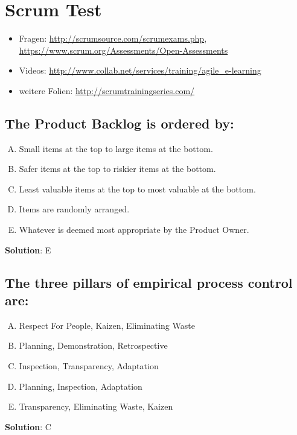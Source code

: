 \pagebreak

\section{Scrum Test}

\begin{itemize}
  \item Fragen: \url{http://scrumsource.com/scrumexams.php}, \url{https://www.scrum.org/Assessments/Open-Assessments}
  \item Videos: \url{http://www.collab.net/services/training/agile_e-learning}
  \item weitere Folien: \url{http://scrumtrainingseries.com/}
\end{itemize}


\subsection{The Product Backlog is ordered by:}
\begin{enumerate}[A)]
  \item Small items at the top to large items at the bottom.
  \item Safer items at the top to riskier items at the bottom.
  \item Least valuable items at the top to most valuable at the bottom.
  \item Items are randomly arranged.
  \item Whatever is deemed most appropriate by the Product Owner.
\end{enumerate}


\textbf{Solution}: E


\subsection{The three pillars of empirical process control are:}
\begin{enumerate}[A)]
  \item Respect For People, Kaizen, Eliminating Waste
  \item Planning, Demonstration, Retrospective
  \item Inspection, Transparency, Adaptation
  \item Planning, Inspection, Adaptation
  \item Transparency, Eliminating Waste, Kaizen
\end{enumerate}


\textbf{Solution}: C


